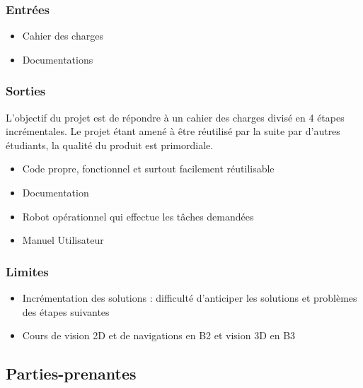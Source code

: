 \documentclass[10pt,a4paper]{article}
\begin{document}
\subsubsection{Entrées}
\begin{itemize}
\renewcommand{\labelitemi}{\mbox{\ooalign{$\checkmark$\cr\hidewidth$\square$\hidewidth\cr}}}
\item Cahier des charges
\item Documentations
\end{itemize}

\subsubsection{Sorties}
L'objectif du projet est de répondre à un cahier des charges divisé en 4 étapes incrémentales. Le projet étant amené à être réutilisé par la suite par d'autres étudiants, la qualité du produit est primordiale.

\begin{itemize}
\renewcommand{\labelitemi}{$\square$}
\item Code propre, fonctionnel et surtout facilement réutilisable 
\item Documentation
\item Robot opérationnel qui effectue les tâches demandées
\item Manuel Utilisateur
\end{itemize} 

\subsubsection{Limites}
\begin{itemize}
\item Incrémentation des solutions : difficulté d'anticiper les solutions et problèmes des étapes suivantes
\item Cours de vision 2D et de navigations en B2 et vision 3D en B3
\end{itemize} 

\subsection{Parties-prenantes}
\end{document}
